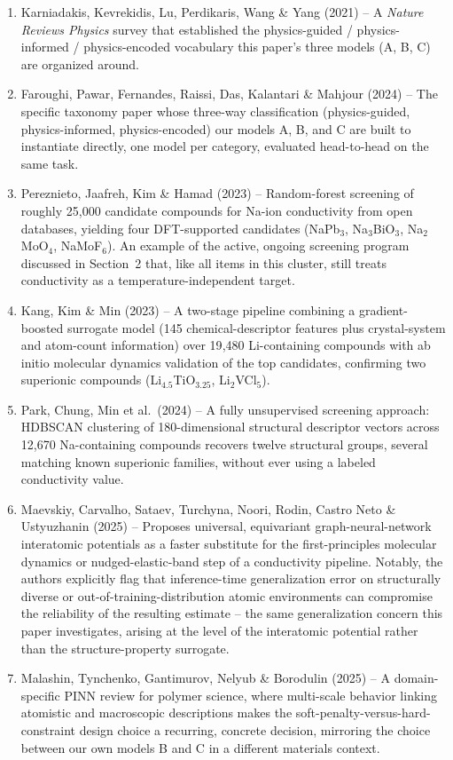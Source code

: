 \documentclass[11pt]{article}
\begin{document}
\begin{enumerate}
\item Karniadakis, Kevrekidis, Lu, Perdikaris, Wang \& Yang (2021) -- A \emph{Nature Reviews Physics} survey that established the physics-guided / physics-informed / physics-encoded vocabulary this paper's three models (A, B, C) are organized around.
\item Faroughi, Pawar, Fernandes, Raissi, Das, Kalantari \& Mahjour (2024) -- The specific taxonomy paper whose three-way classification (physics-guided, physics-informed, physics-encoded) our models A, B, and C are built to instantiate directly, one model per category, evaluated head-to-head on the same task.
\item Pereznieto, Jaafreh, Kim \& Hamad (2023) -- Random-forest screening of roughly 25{,}000 candidate compounds for Na-ion conductivity from open databases, yielding four DFT-supported candidates (NaPb$_3$, Na$_3$BiO$_3$, Na$_2$MoO$_4$, NaMoF$_6$). An example of the active, ongoing screening program discussed in Section~2 that, like all items in this cluster, still treats conductivity as a temperature-independent target.
\item Kang, Kim \& Min (2023) -- A two-stage pipeline combining a gradient-boosted surrogate model (145 chemical-descriptor features plus crystal-system and atom-count information) over 19{,}480 Li-containing compounds with ab initio molecular dynamics validation of the top candidates, confirming two superionic compounds (Li$_{4.5}$TiO$_{3.25}$, Li$_2$VCl$_5$).
\item Park, Chung, Min et al.\ (2024) -- A fully unsupervised screening approach: HDBSCAN clustering of 180-dimensional structural descriptor vectors across 12{,}670 Na-containing compounds recovers twelve structural groups, several matching known superionic families, without ever using a labeled conductivity value.
\item Maevskiy, Carvalho, Sataev, Turchyna, Noori, Rodin, Castro Neto \& Ustyuzhanin (2025) -- Proposes universal, equivariant graph-neural-network interatomic potentials as a faster substitute for the first-principles molecular dynamics or nudged-elastic-band step of a conductivity pipeline. Notably, the authors explicitly flag that inference-time generalization error on structurally diverse or out-of-training-distribution atomic environments can compromise the reliability of the resulting estimate -- the same generalization concern this paper investigates, arising at the level of the interatomic potential rather than the structure-property surrogate.
\item Malashin, Tynchenko, Gantimurov, Nelyub \& Borodulin (2025) -- A domain-specific PINN review for polymer science, where multi-scale behavior linking atomistic and macroscopic descriptions makes the soft-penalty-versus-hard-constraint design choice a recurring, concrete decision, mirroring the choice between our own models B and C in a different materials context.

\end{enumerate}
\end{document}
